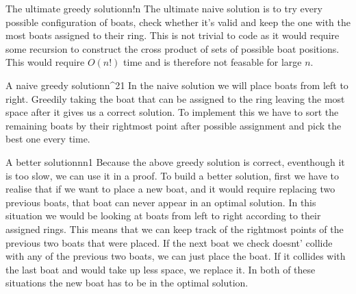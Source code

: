 \documentclass{writeup}
\begin{document}
\begin{solutions}
  \begin{solution}{The ultimate greedy solution}{n!}{n}
    The ultimate naive solution is to try every possible configuration of boats, check whether it's valid and keep the one with the most boats assigned to their ring.
    This is not trivial to code as it would require some recursion to construct the cross product of sets of possible boat positions.
    This would require $O(n!)$ time and is therefore not feasable for large $n$.
  \end{solution}
  
  \begin{solution}{A naive greedy solution}{n^2}{1}
    In the naive solution we will place boats from left to right.
    Greedily taking the boat that can be assigned to the ring leaving the most space after it gives us a correct solution.
    To implement this we have to sort the remaining boats by their rightmost point after possible assignment and pick the best one every time.

  \end{solution}

  \begin{solution}{A better solution}{n\log n}{1}
    Because the above greedy solution is correct, eventhough it is too slow, we can use it in a proof.
    To build a better solution, first we have to realise that if we want to place a new boat, and it would require replacing two previous boats, that boat can never appear in an optimal solution.
    In this situation we would be looking at boats from left to right according to their assigned rings.
    This means that we can keep track of the rightmost points of the previous two boats that were placed.
    If the next boat we check doesnt' collide with any of the previous two boats, we can just place the boat.
    If it collides with the last boat and would take up less space, we replace it.
    In both of these situations the new boat has to be in the optimal solution.
  \end{solution}
\end{solutions}
\end{document}
